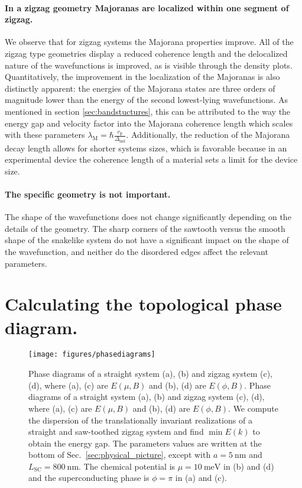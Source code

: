 \documentclass[english, twocolumn, 10pt, aps, superscriptaddress, floatfix, prb, citeautoscript]{revtex4-1}
\renewcommand{\comment}[2]{#2}
\renewcommand{\comment}{\paragraph}
\begin{document}
\comment{In a zigzag geometry Majoranas are localized within one segment of zigzag.}
We observe that for zigzag systems the Majorana properties improve.
All of the zigzag type geometries display a reduced coherence length and the delocalized nature of the wavefunctions is improved, as is visible through the density plots.
Quantitatively, the improvement in the localization of the Majoranas is also distinctly apparent: the energies of the Majorana states are three orders of magnitude lower than the energy of the second lowest-lying wavefunctions.
As mentioned in section \ref{sec:bandstuctures}, this can be attributed to the way the energy gap and velocity factor into the Majorana coherence length which scales with these parameters $\lambda_\textrm{M}=\hbar\frac{v_\textrm{F}}{\Delta_\textrm{ind}}$.
Additionally, the reduction of the Majorana decay length allows for shorter systems sizes, which is favorable because in an experimental device the coherence length of a material sets a limit for the device size.

\comment{The specific geometry is not important.}
The shape of the wavefunctions does not change significantly depending on the details of the geometry.
The sharp corners of the sawtooth versus the smooth shape of the snakelike system do not have a significant impact on the shape of the wavefunction, and neither do the disordered edges affect the relevant parameters.

\section{Calculating the topological phase diagram.}

\begin{figure}[!htb]
\texttt{[image: figures/phasediagrams]}
\caption{Phase diagrams of a straight system (a), (b) and zigzag system (c), (d), where (a), (c) are $E(\mu, B)$ and (b), (d) are $E(\phi, B)$.
Phase diagrams of a straight system (a), (b) and zigzag system (c), (d), where (a), (c) are $E(\mu, B)$ and (b), (d) are $E(\phi, B)$.
We compute the dispersion of the translationally invariant realizations of a straight and saw-toothed zigzag system and find $\min{E(k)}$ to obtain the energy gap.
The parameters values are written at the bottom of Sec.~\ref{sec:physical_picture}, except with $a=\SI{5}{\nm}$ and $L_\textrm{SC}=\SI{800}{\nm}$.
The chemical potential is $\mu=\SI{10}{\meV}$ in (b) and (d) and the superconducting phase is $\phi=\pi$ in (a) and (c).
\label{fig:phasediagrams}}
\end{figure}
\end{document}

